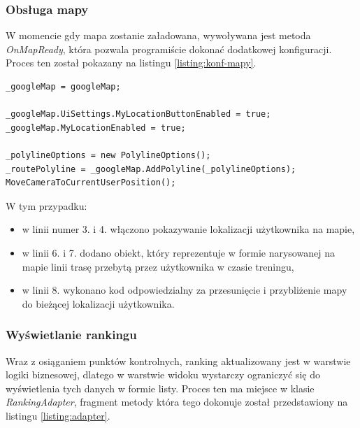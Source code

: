 \subsubsection{Obsługa mapy}
W momencie gdy mapa zostanie załadowana, wywoływana jest metoda \textit{OnMapReady}, która pozwala programiście dokonać dodatkowej konfiguracji. Proces ten został pokazany na listingu \ref{listing:konf-mapy}. 

\begin{lstlisting}[caption={Konfiguracja mapy},label=listing:konf-mapy]
_googleMap = googleMap;

_googleMap.UiSettings.MyLocationButtonEnabled = true;
_googleMap.MyLocationEnabled = true;

_polylineOptions = new PolylineOptions();
_routePolyline = _googleMap.AddPolyline(_polylineOptions);
MoveCameraToCurrentUserPosition();
\end{lstlisting}
W tym przypadku:
\begin{itemize}
\item{w linii numer 3. i 4. włączono pokazywanie lokalizacji użytkownika na mapie},
\item{w linii 6. i 7. dodano obiekt, który reprezentuje w formie narysowanej na mapie linii trasę przebytą przez użytkownika w czasie treningu},
\item{w linii 8. wykonano kod odpowiedzialny za przesunięcie i przybliżenie mapy do bieżącej lokalizacji użytkownika}.
\end{itemize}
\subsubsection{Wyświetlanie rankingu}
Wraz z osiąganiem punktów kontrolnych, ranking aktualizowany jest w warstwie logiki biznesowej, dlatego w warstwie widoku wystarczy ograniczyć się do wyświetlenia tych danych w formie listy. Proces ten ma miejsce w klasie \textit{RankingAdapter}, fragment metody która tego dokonuje został przedstawiony na listingu \ref{listing:adapter}.

